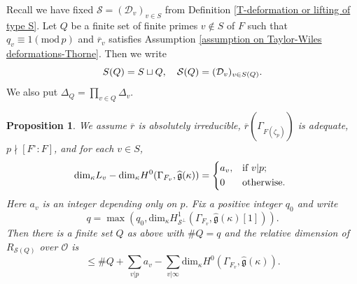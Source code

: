 \documentclass[12pt,oneside,reqno]{amsart}
\theoremstyle{plain}
\newtheorem{proposition}[theorem]{Proposition}
\begin{document}
	
	
	
	Recall we have fixed
	$\mathcal{S}=(\mathcal{D}_v)_{v\in S}$
	from
	Definition
	\ref{T-deformation or lifting of type S}. Let $Q$ be a finite set of finite primes $v\notin S$ of $F$
	such that
	$q_v\equiv1
	(\mathrm{mod}\,p)$
	and
	$\overline{r}_v$ satisfies
	Assumption
	\ref{assumption on Taylor-Wiles deformations-Thorne}.
	Then we write
	\[
	S(Q)=S\sqcup Q,
	\quad
	\mathcal{S}(Q)
	=
	(\mathcal{D}_v)_{v\in S(Q)}.
	\index{S@$S(Q),\mathcal{S}(Q)$}
	\]
	We also put
	$\Delta_Q=\prod_{v\in Q}\Delta_v$.
	
	
	
	\begin{proposition}\label{existence of Twylor-Wiles primes}
		We assume
		$\overline{r}$ is
		absolutely irreducible,
		$\overline{r}(\Gamma_{F(\zeta_p)})$
		is adequate, $p\nmid[F^\circ:F]$,
		and for each
		$v\in S$,
		\[
		\mathrm{dim}_\kappa
		L_v
		-
		\mathrm{dim}_\kappa
		H^0(\Gamma_{F_v},
		\widehat{\mathfrak{g}}(\kappa))
		=
		\begin{cases*}
			a_v,
			&
			if $v |p$;
			\\
			0
			&
			otherwise.
		\end{cases*}
		\]
		Here $a_v$ is an integer depending only on $p$.
		Fix a positive integer
		$q_0$ and write
		\[
		q=\max
		\left(
		q_0,
		\mathrm{dim}_\kappa
		H^1_{\mathcal{S}^\perp}
		\left(
		\Gamma_{F_v},
		\widehat{\mathfrak{g}}(\kappa)[1]
		\right)
		\right).
		\]
		Then there is a finite set $Q$ as above with $\#  Q=q$ and the relative dimension of $R_{\mathcal{S}(Q)}$ over $\mathcal{O}$ is
		\[
		\leq
		\#  Q
		+
		\sum_{v |p}a_v
		-\sum_{v |\infty}
		\mathrm{dim}_\kappa
		H^0(\Gamma_{F_v},
		\widehat{\mathfrak{g}}(\kappa)).
		\]
		
	\end{proposition}
\end{document}
